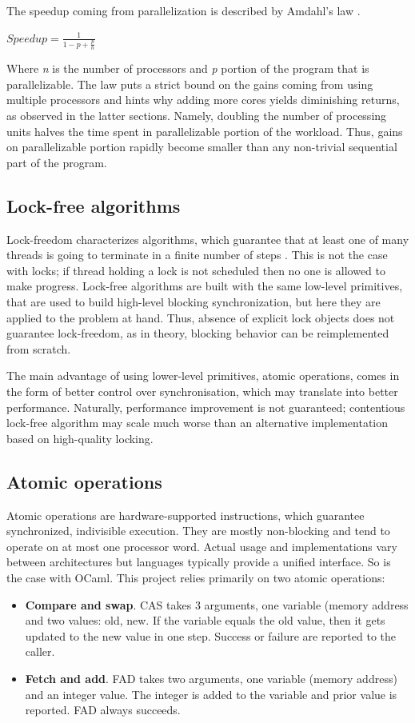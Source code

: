 \documentclass[12pt,a4paper,twoside]{report}
\begin{document}
The speedup coming from parallelization is described by Amdahl's law \cite{art_of_mult}.

\begin{center}
$Speedup = \frac{1}{1 - p + \frac{p}{n}}$
\end{center} 

Where \textit{n} is the number of processors and \textit{p} portion of the program that is parallelizable. The law puts a strict bound on the gains coming from using multiple processors and hints why adding more cores yields diminishing returns, as observed in the latter sections. Namely, doubling the number of processing units halves the time spent in parallelizable portion of the workload. Thus, gains on parallelizable portion rapidly become smaller than any non-trivial sequential part of the program. 

\subsection{Lock-free algorithms}
Lock-freedom characterizes algorithms, which guarantee that at least one of many threads is going to terminate in a finite number of steps \cite{art_of_mult}. This is not the case with locks; if thread holding a lock is not scheduled then no one is allowed to make progress. Lock-free algorithms are built with the same low-level primitives, that are used to build high-level blocking synchronization, but here they are applied to the problem at hand. Thus, absence of explicit lock objects does not guarantee lock-freedom, as in theory, blocking behavior can be reimplemented from scratch. 

The main advantage of using lower-level primitives, atomic operations, comes in the form of better control over synchronisation, which may translate into better performance. Naturally, performance improvement is not guaranteed; contentious lock-free algorithm may scale much worse than an alternative implementation based on high-quality locking. 

\subsection{Atomic operations}
Atomic operations are hardware-supported instructions, which guarantee synchronized, indivisible execution. They are mostly non-blocking and tend to operate on at most one processor word. Actual usage and implementations vary between architectures but languages typically provide a unified interface. So is the case with OCaml. This project relies primarily on two atomic operations:
\begin{itemize}
    \item \textbf{Compare and swap}. CAS takes 3 arguments, one variable (memory address and two values: old, new. If the variable equals the old value, then it gets updated to the new value in one step. Success or failure are reported to the caller.  
    \item \textbf{Fetch and add}. FAD takes two arguments, one variable (memory address) and an integer value. The integer is added to the variable and prior value is reported. FAD always succeeds.  
\end{itemize}
\end{document}
